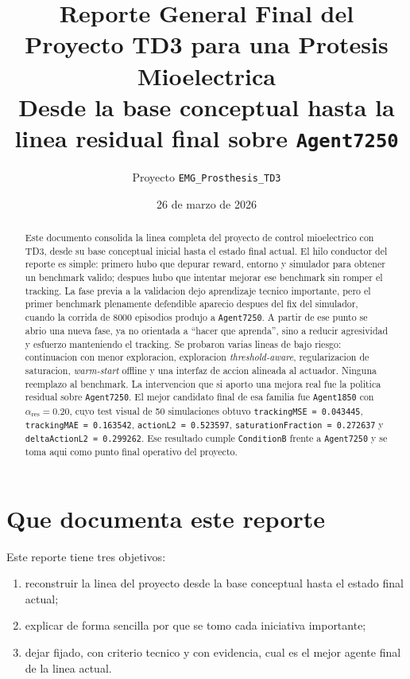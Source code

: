\documentclass[11pt,a4paper]{article}
\title{\textbf{Reporte General Final del Proyecto TD3 para una Protesis Mioelectrica}\\
\large Desde la base conceptual hasta la linea residual final sobre \texttt{Agent7250}}
\author{Proyecto \texttt{EMG\_Prosthesis\_TD3}}
\date{26 de marzo de 2026}
\begin{document}
\maketitle

\begin{abstract}
Este documento consolida la linea completa del proyecto de control mioelectrico con TD3, desde su base conceptual inicial hasta el estado final actual. El hilo conductor del reporte es simple: primero hubo que depurar reward, entorno y simulador para obtener un benchmark valido; despues hubo que intentar mejorar ese benchmark sin romper el tracking. La fase previa a la validacion dejo aprendizaje tecnico importante, pero el primer benchmark plenamente defendible aparecio despues del fix del simulador, cuando la corrida de 8000 episodios produjo a \texttt{Agent7250}. A partir de ese punto se abrio una nueva fase, ya no orientada a ``hacer que aprenda'', sino a reducir agresividad y esfuerzo manteniendo el tracking. Se probaron varias lineas de bajo riesgo: continuacion con menor exploracion, exploracion \textit{threshold-aware}, regularizacion de saturacion, \textit{warm-start} offline y una interfaz de accion alineada al actuador. Ninguna reemplazo al benchmark. La intervencion que si aporto una mejora real fue la politica residual sobre \texttt{Agent7250}. El mejor candidato final de esa familia fue \texttt{Agent1850} con \(\alpha_{\mathrm{res}} = 0.20\), cuyo test visual de 50 simulaciones obtuvo \texttt{trackingMSE = 0.043445}, \texttt{trackingMAE = 0.163542}, \texttt{actionL2 = 0.523597}, \texttt{saturationFraction = 0.272637} y \texttt{deltaActionL2 = 0.299262}. Ese resultado cumple \texttt{ConditionB} frente a \texttt{Agent7250} y se toma aqui como punto final operativo del proyecto.
\end{abstract}

\tableofcontents
\newpage

\section{Que documenta este reporte}

Este reporte tiene tres objetivos:
\begin{enumerate}[leftmargin=1.5em]
\item reconstruir la linea del proyecto desde la base conceptual hasta el estado final actual;
\item explicar de forma sencilla por que se tomo cada iniciativa importante;
\item dejar fijado, con criterio tecnico y con evidencia, cual es el mejor agente final de la linea actual.
\end{enumerate}
\end{document}
